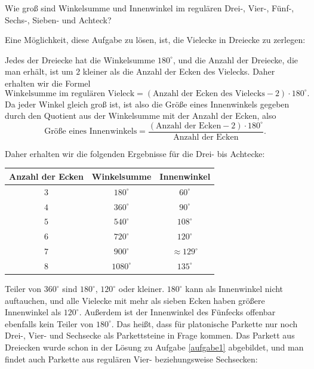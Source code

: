 \documentclass{zusammenfassung}
\begin{document}
\begin{aufgabe}
  Wie groß sind Winkelsumme und Innenwinkel im regulären Drei-, Vier-, Fünf-, Sechs-, Sieben- und Achteck?
\end{aufgabe}

Eine Möglichkeit, diese Aufgabe zu lösen, ist, die Vielecke in Dreiecke zu zerlegen:

\begin{center}
\end{center}

Jedes der Dreiecke hat die Winkelsumme $180^\circ$, und die Anzahl der Dreiecke, die man erhält, ist um $2$ kleiner als die
Anzahl der Ecken des Vielecks. Daher erhalten wir die Formel
\[
  \text{Winkelsumme im regulären Vieleck}=(\text{Anzahl der Ecken des Vielecks}-2)\cdot 180^\circ.
\]
Da jeder Winkel gleich groß ist, ist also die Größe eines Innenwinkels gegeben durch den Quotient aus der Winkelsumme mit der
Anzahl der Ecken, also
\[
  \text{Größe eines Innenwinkels}=\frac{(\text{Anzahl der Ecken}-2)\cdot 180^\circ}{\text{Anzahl der Ecken}}.
\]

Daher erhalten wir die folgenden Ergebnisse für die Drei- bis Achtecke:

\begin{center}
  \begin{tabular}{ccc}
    \toprule
    \textbf{Anzahl der Ecken}&\textbf{Winkelsumme}&\textbf{Innenwinkel}\\
    \midrule
    $3$&$180^\circ$&$60^\circ$\\
    $4$&$360^\circ$&$90^\circ$\\
    $5$&$540^\circ$&$108^\circ$\\
    $6$&$720^\circ$&$120^\circ$\\
    $7$&$900^\circ$&$\approx 129^\circ$\\
    $8$&$1080^\circ$&$135^\circ$\\
   \bottomrule
  \end{tabular}
\end{center}

Teiler von $360^\circ$ sind $180^\circ$, $120^\circ$ oder kleiner. $180^\circ$ kann als Innenwinkel nicht auftauchen, und
alle Vielecke mit mehr als sieben Ecken haben größere Innenwinkel als $120^\circ$. Außerdem ist der Innenwinkel des Fünfecks
offenbar ebenfalls kein Teiler von $180^\circ$. Das heißt, dass für platonische Parkette nur noch Drei-, Vier- und Sechsecke
als Parkettsteine in Frage kommen. Das Parkett aus Dreiecken wurde schon in der Lösung zu Aufgabe \ref{aufgabe1} abgebildet,
und man findet auch Parkette aus regulären Vier- beziehungsweise Sechsecken:
\end{document}
